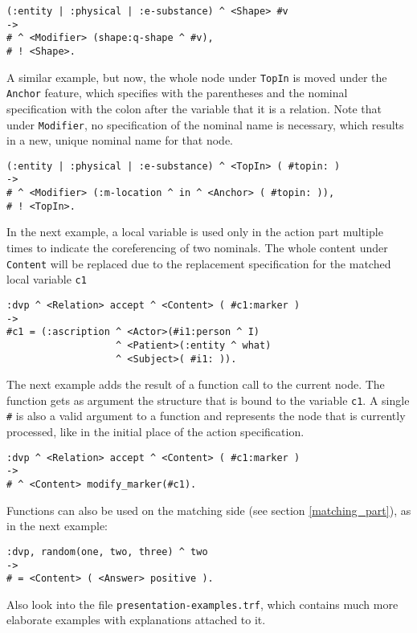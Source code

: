 \documentclass[11pt,a4paper]{article}
\newcommand{\cd}[1]{\texttt{#1}}
\begin{document}
{\begin{verbatim}
(:entity | :physical | :e-substance) ^ <Shape> #v
->
# ^ <Modifier> (shape:q-shape ^ #v),
# ! <Shape>.
\end{verbatim}

A similar example, but now, the whole node under \cd{TopIn} is moved under the
\cd{Anchor} feature, which specifies with the parentheses and the nominal
specification with the colon after the variable that it is a relation.
Note that under \cd{Modifier}, no specification of the nominal name is
necessary, which results in a new, unique nominal name for that node.

\begin{verbatim}
(:entity | :physical | :e-substance) ^ <TopIn> ( #topin: )
->
# ^ <Modifier> (:m-location ^ in ^ <Anchor> ( #topin: )),
# ! <TopIn>.
\end{verbatim}

In the next example, a local variable is used only in the action part multiple
times to indicate the coreferencing of two nominals. The whole content under
\cd{Content} will be replaced due to the replacement specification for the
matched local variable \cd{c1}

\begin{verbatim}
:dvp ^ <Relation> accept ^ <Content> ( #c1:marker )
->
#c1 = (:ascription ^ <Actor>(#i1:person ^ I)
                   ^ <Patient>(:entity ^ what)
                   ^ <Subject>( #i1: )).
\end{verbatim}

The next example adds the result of a function call to the current node. The
function gets as argument the structure that is bound to the variable
\texttt{c1}. A single \texttt{\#} is also a valid argument to a function and
represents the node that is currently processed, like in the initial place of
the action specification.

\begin{verbatim}
:dvp ^ <Relation> accept ^ <Content> ( #c1:marker )
->
# ^ <Content> modify_marker(#c1).
\end{verbatim}

Functions can also be used on the matching side (see section
\ref{matching_part}), as in the next example:

\begin{verbatim}
:dvp, random(one, two, three) ^ two
->
# = <Content> ( <Answer> positive ).
\end{verbatim}

Also look into the file \texttt{presentation-examples.trf}, which contains
much more elaborate examples with explanations attached to it.

}
\end{document}
